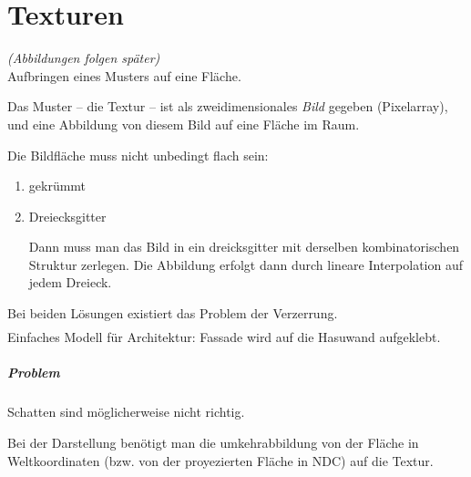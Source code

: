 \chapter{Texturen}
\emph{(Abbildungen folgen später)}\\
Aufbringen eines Musters auf eine Fläche.
\begin{center}
\end{center}
Das Muster -- die Textur -- ist als zweidimensionales \emph{Bild} gegeben (Pixelarray), und eine Abbildung
von diesem Bild auf eine Fläche im Raum.
\begin{center}
\end{center}
Die Bildfläche muss nicht unbedingt flach sein:
\begin{enumerate}
 \item gekrümmt
	\begin{center}
	\end{center}
 \item Dreiecksgitter
	\begin{center}
	\end{center}
	Dann muss man das Bild in ein dreicksgitter mit derselben kombinatorischen Struktur zerlegen.
	Die Abbildung erfolgt dann durch lineare Interpolation auf jedem Dreieck.
\end{enumerate}
Bei beiden Lösungen existiert das Problem der Verzerrung.
\begin{align*}
\end{align*}
Einfaches Modell für Architektur: Fassade wird auf die Hasuwand aufgeklebt.
\paragraph*{Problem} Schatten sind möglicherweise nicht richtig.

Bei der Darstellung benötigt man die umkehrabbildung von der Fläche in Weltkoordinaten
(bzw. von der proyezierten Fläche in NDC) auf die Textur.

